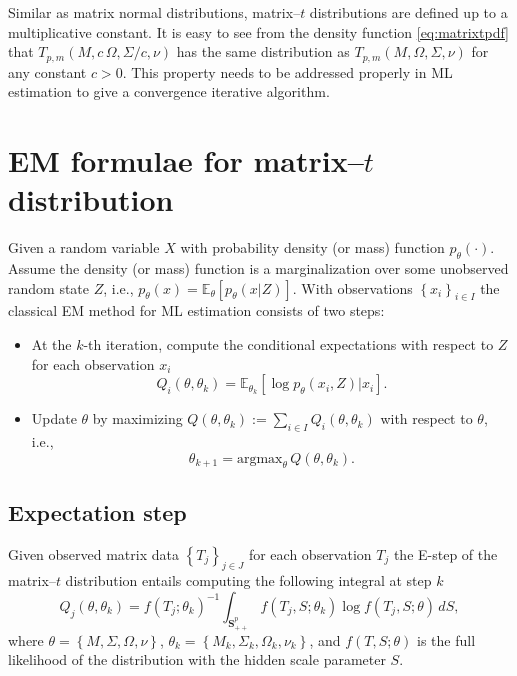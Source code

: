 \documentclass[english,listof=totoc]{scrartcl}
\begin{document}
Similar as matrix normal distributions, matrix--$t$ distributions are defined up to a multiplicative constant. It is easy to see from the density function \eqref{eq:matrixtpdf} that $T_{p,m}(M,c\,\Omega,\Sigma/c,\nu)$ has the same distribution as $T_{p,m}(M,\Omega,\Sigma,\nu)$ for any constant $c>0$. This property needs to be addressed properly in ML estimation to give a convergence iterative algorithm.

\section{EM formulae for matrix--$t$ distribution}\label{sec:EM}

Given a random variable $X$ with probability density (or mass) function $p_{\theta}(\cdot)$. Assume the density (or mass) function is a marginalization over some unobserved random state $Z$, i.e., $p_{\theta}(x)=\mathbb{E}_{\theta}\left[p_{\theta}(x|Z)\right]$. With observations $\left\{x_i\right\}_{i\in I}$ the classical EM method for ML estimation consists of two steps:

\begin{itemize}
\item At the $k$-th iteration, compute the conditional expectations with respect to $Z$ for each observation $x_i$
\begin{equation}
Q_i(\theta,\theta_k)=\mathbb{E}_{\theta_k}\left[\log p_{\theta}(x_i,Z)|x_i\right].
\end{equation}

\item Update $\theta$ by maximizing $Q(\theta,\theta_k):=\sum_{i\in I}Q_i(\theta,\theta_k)$ with respect to $\theta$, i.e.,
\begin{equation}
\theta_{k+1} = \textrm{argmax}_{\theta}\,Q(\theta,\theta_k).
\end{equation}
\end{itemize}

\subsection{Expectation step}

Given observed matrix data $\left\{T_j\right\}_{j\in J}$ for each observation $T_j$ the E-step of the matrix--$t$ distribution entails computing the following integral at step $k$
\begin{equation}
Q_j(\theta,\theta_k)=f(T_j;\theta_k)^{-1}\int_{\mathbf{S}_{++}^p}f(T_{j},S;\theta_k)\log f\left(T_{j},S;\theta\right)\,dS,\label{eq:expdef}
\end{equation}
where $\theta=\left\{M,\Sigma,\Omega,\nu\right\}$, $\theta_k=\left\{M_k,\Sigma_k,\Omega_k,\nu_k\right\}$, and $f(T,S;\theta)$ is the full likelihood of the distribution with the hidden scale parameter $S$.
\end{document}
